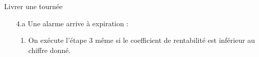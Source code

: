 \begin{UseCase}{Livrer une tournée}
\begin{UseCaseExtension}
\begin{enumerate}
\begin{enumerate}
                \item Envoyer une équipe à sa recherche en suivant son trajet.
                \item Si le drone est trouvé, le placer au service technique
                \item Si le drone n'est pas trouvé, prévenir la police.
                \item Créer un fichier log qui sera lu plus tard par un expert.
            \end{enumerate}
        \item[4.a] Une alarme arrive à expiration :
            \begin{enumerate}
                \item On exécute l'étape 3 même si le coefficient de
                    rentabilité est inférieur au chiffre donné.
            \end{enumerate}
    \end{enumerate}
\end{UseCaseExtension}

\end{UseCase}
